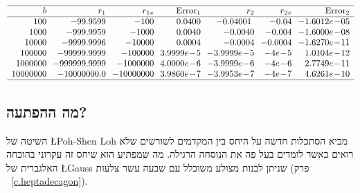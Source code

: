 \begin{table}[bht]
\caption[שני חישובים של השורשים של משוואה ריבועית]%
{שני חישובים של השורשים של משוואה ריבועית.
$r_1,r_2$
הם השורשים שחושבו לפי משוואה%
~\ref{eq.quadratic-numerical}.
$r_{1v},r_{2v}$
הם השורשים שחושבו לפי משוואה%
~\ref{eq.viete-quad}.
השגיאות הן
$r_{i}-r_{iv}$.
מספרים בנקודה צפה נכתבו כ-%
$-4e-5$
במקום
$4\times 10^{-5}$
כי תכניות מחשב נכתבים לרוב כסדרה ליניארית של סימנים
.} \label{t.quadratic}
\begin{footnotesize}
\[
\begin{array}{r@{\hspace{2.5mm}}r@{\hspace{2.5mm}}r@{\hspace{2.5mm}}r@{\hspace{2.5mm}}r@{\hspace{2.5mm}}r@{\hspace{2.5mm}}r}
\hline
b & r_1 & r_{1v} & \mathrm{Error}_1 & r_2 & r_{2v} & \mathrm{Error}_2\\
\hline
100  &  -99.9599  &  -100  &  0.0400  &  -0.04001\  &  -0.04  &  -1.6012e\!-\!05\\
1000  &  -999.9959  &  -1000  &  0.0040  &  -0.0040  &  -0.004  &  -1.6000e\!-\!08\\
10000  &  -9999.9996  &  -10000  &  0.0004  &  -0.0004  &  -0.0004  &  -1.6270e\!-\!11\\
100000  &  -99999.9999  &  -100000  &  3.9999e\!-\!5  &  -3.9999e\!-\!5  &  -4e\!-\!5  &  1.0104e\!-\!12\\
1000000  &  -999999.9999  &  -1000000  &  4.0000e\!-\!6  &  -3.9999e\!-\!6  &  -4e\!-\!6  &  2.7749e\!-\!11\\
10000000  &  -10000000.0  &  -10000000  &  3.9860e\!-\!7  &  -3.9953e\!-\!7  &  -4e\!-\!7  &  4.6261e\!-\!10\\
\hline
\end{array}
\]
\end{footnotesize}
\end{table}

\subsection*{מה  ההפתעה?}

השיטה של 
\L{Poh-Shen Loh}
מביא הסתכלות חדשה על היחס בין המקדמים לשורשים שלא רואים כאשר לומדים בעל פה את הנוסחה הרגילה. מה שמפתיע הוא שיחס זה עקרוני בהוכחה האלגברית של 
\L{Gauss}
שניתן לבנות מצולע משוכלל עם שבעה עשר צלעות (פרק%
~\ref{c.heptadecagon}).

